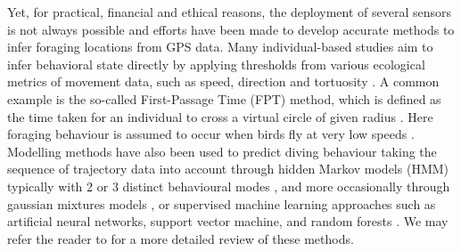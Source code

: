 \documentclass{article}
\begin{document}
Yet, for practical, financial and ethical reasons, the deployment of several sensors is not always possible and efforts have been made to develop accurate methods to infer foraging locations from GPS data.
Many individual-based studies aim to infer behavioral state directly by applying thresholds from various ecological metrics of movement data, such as speed, direction and tortuosity \cite{dean_simultaneous_2015,seidel_ecological_2018}.
A common example is the so-called First-Passage Time (FPT) method, which is defined as the time taken for an individual to cross a virtual circle of given radius \cite{carter_navigating_2016,pinaud_at-sea_2007,sommerfeld_foraging_2013}. Here foraging behaviour is assumed to occur when birds fly at very low speeds \cite{weimerskirch_foraging_2008}.
Modelling methods have also been used to predict diving behaviour taking the sequence of trajectory data into account through hidden Markov models (HMM) typically with 2 or 3 distinct behavioural modes \cite{boyd_movement_2014,dunphy_seabirds_2020,mcclintock_momentuhmm_2018,oppel_foraging_2015}, and more occasionally through gaussian mixtures models \cite{guilford_gps_2008,mendez_geographical_2017}, or supervised machine learning approaches such as artificial neural networks, support vector machine, and random forests \cite{guilford_migration_2009, wang_machine_2019}. We may refer the reader to
\cite{joo_navigating_2020} for a more detailed review of these methods.
\end{document}
